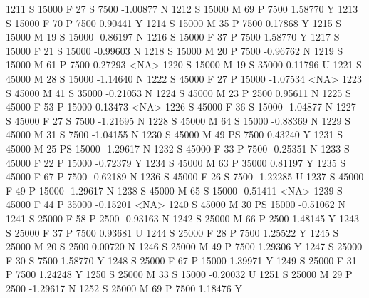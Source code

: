 \documentclass{article}
\begin{document}
\begin{Schunk}
\begin{Soutput}
1211      S      15000   F  27         S   7500  -1.00877    N
1212      S      15000   M  69         P   7500   1.58770    Y
1213      S      15000   F  70         P   7500   0.90441    Y
1214      S      15000   M  35         P   7500   0.17868    Y
1215      S      15000   M  19         S  15000  -0.86197    N
1216      S      15000   F  37         P   7500   1.58770    Y
1217      S      15000   F  21         S  15000  -0.99603    N
1218      S      15000   M  20         P   7500  -0.96762    N
1219      S      15000   M  61         P   7500   0.27293 <NA>
1220      S      15000   M  19         S  35000   0.11796    U
1221      S      45000   M  28         S  15000  -1.14640    N
1222      S      45000   F  27         P  15000  -1.07534 <NA>
1223      S      45000   M  41         S  35000  -0.21053    N
1224      S      45000   M  23         P   2500   0.95611    N
1225      S      45000   F  53         P  15000   0.13473 <NA>
1226      S      45000   F  36         S  15000  -1.04877    N
1227      S      45000   F  27         S   7500  -1.21695    N
1228      S      45000   M  64         S  15000  -0.88369    N
1229      S      45000   M  31         S   7500  -1.04155    N
1230      S      45000   M  49        PS   7500   0.43240    Y
1231      S      45000   M  25        PS  15000  -1.29617    N
1232      S      45000   F  33         P   7500  -0.25351    N
1233      S      45000   F  22         P  15000  -0.72379    Y
1234      S      45000   M  63         P  35000   0.81197    Y
1235      S      45000   F  67         P   7500  -0.62189    N
1236      S      45000   F  26         S   7500  -1.22285    U
1237      S      45000   F  49         P  15000  -1.29617    N
1238      S      45000   M  65         S  15000  -0.51411 <NA>
1239      S      45000   F  44         P  35000  -0.15201 <NA>
1240      S      45000   M  30        PS  15000  -0.51062    N
1241      S      25000   F  58         P   2500  -0.93163    N
1242      S      25000   M  66         P   2500   1.48145    Y
1243      S      25000   F  37         P   7500   0.93681    U
1244      S      25000   F  28         P   7500   1.25522    Y
1245      S      25000   M  20         S   2500   0.00720    N
1246      S      25000   M  49         P   7500   1.29306    Y
1247      S      25000   F  30         S   7500   1.58770    Y
1248      S      25000   F  67         P  15000   1.39971    Y
1249      S      25000   F  31         P   7500   1.24248    Y
1250      S      25000   M  33         S  15000  -0.20032    U
1251      S      25000   M  29         P   2500  -1.29617    N
1252      S      25000   M  69         P   7500   1.18476    Y

\end{Soutput}
\end{Schunk}
\end{document}
